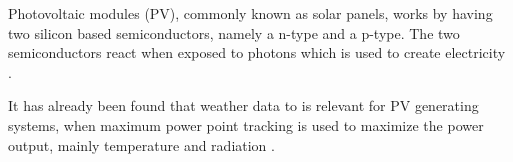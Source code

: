 Photovoltaic modules (PV), commonly known as solar panels, works by
having two silicon based semiconductors, namely a n-type and a p-type.
The two semiconductors react when exposed to photons which is used to
create electricity \citep{photovoltaic}.

It has already been found that weather data to is relevant for PV
generating systems, when maximum power point tracking is used to
maximize the power output, mainly temperature and radiation \citep{mppt2004}.



